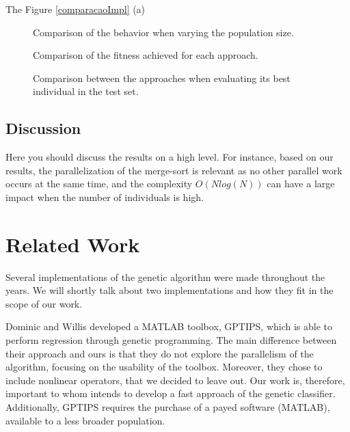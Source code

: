 \documentclass[runningheads]{llncs}
\begin{document}
The Figure \ref{comparacaoImpl} (a)


\begin{figure}[htbp]
\centering
{}
\caption{Comparison of the behavior when varying the population size.} \label{comparacaopopulacao}
\end{figure}

\begin{figure}[htbp]
\centering
{}
\caption{Comparison of the fitness achieved for each approach.} \label{comparacaofitness}
\end{figure}

\begin{figure}[htbp]
\centering
{}
\caption{Comparison between the approaches when evaluating its best individual in the test set.} \label{comparacaoerros}
\end{figure}

\subsection{Discussion}

Here you should discuss the results on a high level. For instance, based on our results, the parallelization of the merge-sort is relevant as no other parallel work occurs at the same time, and the complexity $O(N log(N))$ can have a large impact when the number of individuals is high.

\section{Related Work}

Several implementations of the genetic algorithm were made throughout the years. We will shortly talk about two implementations and how they fit in the scope of our work.

Dominic and Willis  \cite{GPTIPS} developed a MATLAB toolbox, GPTIPS, which is able to perform regression through genetic programming. The main difference between their approach and  ours is that they do not explore the parallelism of the algorithm, focusing on the usability of the toolbox. Moreover, they chose to include nonlinear operators, that we decided to leave out. Our work is, therefore, important to whom intends to develop a fast approach of the genetic classifier. Additionally, GPTIPS requires the purchase of a payed software (MATLAB), available to a less broader population.
\end{document}
